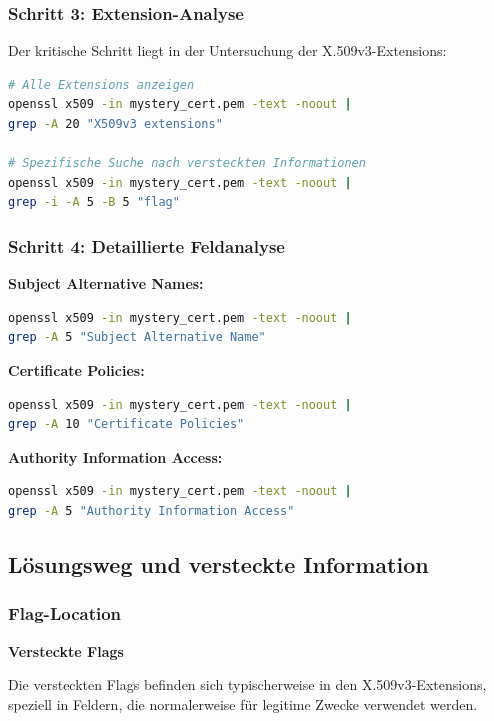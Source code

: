 \documentclass{article}
\begin{document}
\subsubsection{Schritt 3: Extension-Analyse}
Der kritische Schritt liegt in der Untersuchung der X.509v3-Extensions:

\begin{lstlisting}[language=bash]
# Alle Extensions anzeigen
openssl x509 -in mystery_cert.pem -text -noout | 
grep -A 20 "X509v3 extensions"

# Spezifische Suche nach versteckten Informationen
openssl x509 -in mystery_cert.pem -text -noout | 
grep -i -A 5 -B 5 "flag"
\end{lstlisting}

\subsubsection{Schritt 4: Detaillierte Feldanalyse}

\textbf{Subject Alternative Names:}
\begin{lstlisting}[language=bash]
openssl x509 -in mystery_cert.pem -text -noout | 
grep -A 5 "Subject Alternative Name"
\end{lstlisting}

\textbf{Certificate Policies:}
\begin{lstlisting}[language=bash]
openssl x509 -in mystery_cert.pem -text -noout | 
grep -A 10 "Certificate Policies"
\end{lstlisting}

\textbf{Authority Information Access:}
\begin{lstlisting}[language=bash]
openssl x509 -in mystery_cert.pem -text -noout | 
grep -A 5 "Authority Information Access"
\end{lstlisting}

\subsection{Lösungsweg und versteckte Information}

\subsubsection{Flag-Location}

\begin{solutionbox}
\textbf{Versteckte Flags}

Die versteckten Flags befinden sich typischerweise in den X.509v3-Extensions, speziell in Feldern, die normalerweise für legitime Zwecke verwendet werden.
\end{solutionbox}
\end{document}
